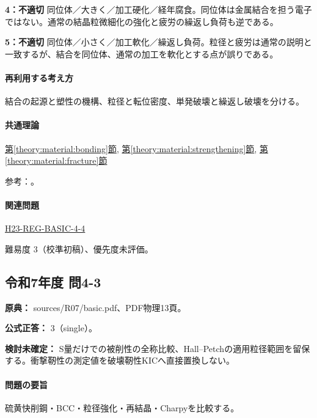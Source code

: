 \noindent\textbf{4：不適切} 同位体／大きく／加工硬化／経年腐食。同位体は金属結合を担う電子ではない。通常の結晶粒微細化の強化と疲労の繰返し負荷も逆である。\par

\noindent\textbf{5：不適切} 同位体／小さく／加工軟化／繰返し負荷。粒径と疲労は通常の説明と一致するが、結合を同位体、通常の加工を軟化とする点が誤りである。\par

\paragraph{再利用する考え方} 結合の起源と塑性の機構、粒径と転位密度、単発破壊と繰返し破壊を分ける。

\paragraph{共通理論} \hyperref[theory:material:bonding]{第\ref*{theory:material:bonding}節}, \hyperref[theory:material:strengthening]{第\ref*{theory:material:strengthening}節}, \hyperref[theory:material:fracture]{第\ref*{theory:material:fracture}節}

\par 参考：\cite{mit_material_dislocations2001,mit_material_fatigue2001,mit_material_atomistic2001}。

\paragraph{関連問題} \hyperref[q:h23-reg-basic-4-4]{H23-REG-BASIC-4-4}

\par 難易度 3（校準初稿）、優先度未評価。

\subsection{令和7年度 問4-3}
\label{q:r07-reg-basic-4-3}

\noindent\textbf{原典：} sources/R07/basic.pdf、PDF物理13頁。

\textbf{公式正答：} 3（single）。

\par\textbf{検討未確定：} S量だけでの被削性の全称比較、Hall–Petchの適用粒径範囲を留保する。衝撃靭性の測定値を破壊靭性KICへ直接置換しない。

\paragraph{問題の要旨} 硫黄快削鋼・BCC・粒径強化・再結晶・Charpyを比較する。

